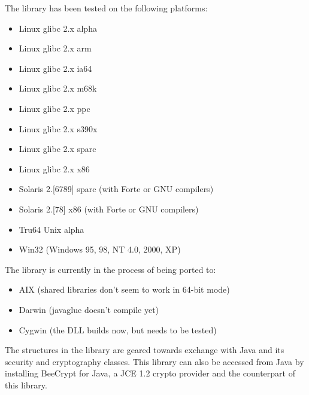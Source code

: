 The library has been tested on the following platforms: \begin{itemize}
\item Linux glibc 2.x alpha \item Linux glibc 2.x arm \item Linux glibc 2.x ia64 \item Linux glibc 2.x m68k \item Linux glibc 2.x ppc \item Linux glibc 2.x s390x \item Linux glibc 2.x sparc \item Linux glibc 2.x x86 \item Solaris 2.\mbox{[}6789\mbox{]} sparc (with Forte or GNU compilers) \item Solaris 2.\mbox{[}78\mbox{]} x86 (with Forte or GNU compilers) \item Tru64 Unix alpha \item Win32 (Windows 95, 98, NT 4.0, 2000, XP) \end{itemize}


The library is currently in the process of being ported to: \begin{itemize}
\item AIX (shared libraries don't seem to work in 64-bit mode) \item Darwin (javaglue doesn't compile yet) \item Cygwin (the DLL builds now, but needs to be tested) \end{itemize}


The structures in the library are geared towards exchange with Java and its security and cryptography classes. This library can also be accessed from Java by installing Bee\-Crypt for Java, a JCE 1.2 crypto provider and the counterpart of this library. 